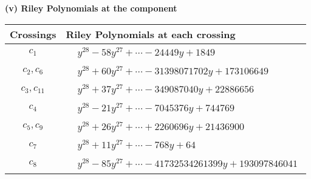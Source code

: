 \documentclass[1p]{elsarticle_modified}
\theoremstyle{definition}
\begin{document}
\newpage\renewcommand{\arraystretch}{1}
\flushleft \textbf{(v) Riley Polynomials at the component}\newline \\
\begin{tabular}{m{50pt}|m{274pt}}
Crossings & \hspace{64pt}Riley Polynomials at each crossing \\
\hline $$\begin{aligned}c_{1}\end{aligned}$$&$\begin{aligned}
&y^{28}-58 y^{27}+\cdots-24449 y+1849
\end{aligned}$\\
\hline $$\begin{aligned}c_{2},c_{6}\end{aligned}$$&$\begin{aligned}
&y^{28}+60 y^{27}+\cdots-31398071702 y+173106649
\end{aligned}$\\
\hline $$\begin{aligned}c_{3},c_{11}\end{aligned}$$&$\begin{aligned}
&y^{28}+37 y^{27}+\cdots-349087040 y+22886656
\end{aligned}$\\
\hline $$\begin{aligned}c_{4}\end{aligned}$$&$\begin{aligned}
&y^{28}-21 y^{27}+\cdots-7045376 y+744769
\end{aligned}$\\
\hline $$\begin{aligned}c_{5},c_{9}\end{aligned}$$&$\begin{aligned}
&y^{28}+26 y^{27}+\cdots+2260696 y+21436900
\end{aligned}$\\
\hline $$\begin{aligned}c_{7}\end{aligned}$$&$\begin{aligned}
&y^{28}+11 y^{27}+\cdots-768 y+64
\end{aligned}$\\
\hline $$\begin{aligned}c_{8}\end{aligned}$$&$\begin{aligned}
&y^{28}-85 y^{27}+\cdots-41732534261399 y+193097846041
\end{aligned}$\\

\end{tabular}
\end{document}
